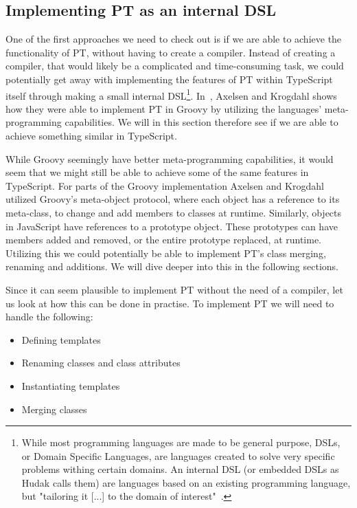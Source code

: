 \subsection{Implementing PT as an internal DSL}\label{subsec:implementing-pt-as-a-ts-library}


One of the first approaches we need to check out is if we are able to achieve the functionality of PT, without having to create a compiler.
Instead of creating a compiler, that would likely be a complicated and time-consuming task, we could potentially get away with implementing the features of PT within TypeScript itself through making a small internal DSL\footnote{While most programming languages are made to be general purpose, DSLs, or Domain Specific Languages, are languages created to solve very specific problems withing certain domains. An internal DSL (or embedded DSLs as Hudak calls them) are languages based on an existing programming language, but "tailoring it [...] to the domain of interest"~\cite{Hudak1997}.}.
In~\cite{groovypt}, Axelsen and Krogdahl shows how they were able to implement PT in Groovy by utilizing the languages' meta-programming capabilities.
We will in this section therefore see if we are able to achieve something similar in TypeScript.

While Groovy seemingly have better meta-programming capabilities, it would seem that we might still be able to achieve some of the same features in TypeScript.
For parts of the Groovy implementation Axelsen and Krogdahl utilized Groovy's meta-object protocol, where each object has a reference to its meta-class, to change and add members to classes at runtime.
Similarly, objects in JavaScript have references to a prototype object.
These prototypes can have members added and removed, or the entire prototype replaced, at runtime.
Utilizing this we could potentially be able to implement PT's class merging, renaming and additions.
We will dive deeper into this in the following sections.

Since it can seem plausible to implement PT without the need of a compiler, let us look at how this can be done in practise.
To implement PT we will need to handle the following:

\begin{itemize}
    \item Defining templates
    \item Renaming classes and class attributes
    \item Instantiating templates
    \item Merging classes
\end{itemize}

